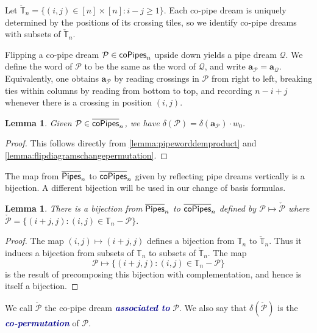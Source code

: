 \documentclass[12 pt]{amsart}
\newcommand{\newword}[1]{\textcolor{darkblue}{\textbf{\emph{#1}}}}
\newtheorem{lemma}[Theorem]{Lemma}
\numberwithin{equation}{section}
\theoremstyle{remark}
\newcommand{\kpipes}{\overline{\sf Pipes}}
\newcommand{\copipes}{{\sf coPipes}}
\newcommand{\kcopipes}{\overline{\sf coPipes}}
\newcommand{\demprod}{\delta}
\begin{document}
	
	Let $\check{\mathbb{T}}_n = \{(i, j) \in [n] \times [n] : i - j \geq 1\}$. 
	Each co-pipe dream is uniquely determined by the positions of its crossing tiles, so we identify co-pipe dreams with subsets of $\check{\mathbb{T}}_n$.
	
	
	
	Flipping a co-pipe dream $\mathcal{P} \in \copipes_n$ upside down yields a pipe dream $\mathcal{Q}$. 
	We define the word of $\mathcal{P}$ to be the same as the word of $\mathcal{Q}$, and write $\mathbf{a}_{\mathcal{P}} = \mathbf{a}_{\mathcal{Q}}$. 
	Equivalently, one obtains $\mathbf{a}_{\mathcal{P}}$ by reading crossings in $\mathcal{P}$ from right to left, breaking ties within columns by reading from bottom to top, and recording $n-i+j$ whenever there is a crossing in position $(i,j)$.

	
	
	
	\begin{lemma}
		\label{lemma:copipewordandpermutation}
		Given $\mathcal{P} \in \kcopipes_n$, we have $\demprod(\mathcal{P}) = \demprod(\mathbf{a}_{\mathcal{P}}) \cdot w_0$.
	\end{lemma}
	\begin{proof}
		This follows directly from \cref{lemma:pipeworddemproduct} and \cref{lemma:flipdiagramschangepermutation}.
	\end{proof}
	
	The map from $\kpipes_n$ to $\kcopipes_n$ given by reflecting pipe dreams vertically is a bijection. 
	A different bijection will be used in our change of basis formulas. 
	
	\begin{lemma}
		There is a bijection from $\kpipes_n$ to $\kcopipes_n$ defined by $\mathcal{P} \mapsto \check{\mathcal{P}}$ where $\check{\mathcal{P}} = \{(i + j,j) : (i,j) \in \mathbb{T}_n-\mathcal{P}\}.$
	\end{lemma}
	\begin{proof}
		The map $(i,j) \mapsto (i + j,j)$ defines a bijection from $\mathbb{T}_n$ to $\check{\mathbb T}_n$. 
		Thus it induces a bijection from subsets of $\mathbb{T}_n$ to subsets of $\check{\mathbb T}_n$. 
		The map 
		\[\mathcal{P} \mapsto \{(i + j,j):(i,j) \in \mathbb{T}_n-\mathcal{P}\}\]
		is the result of precomposing this bijection with complementation, and hence is itself a bijection. 
	\end{proof}
	
	We call $\check{\mathcal{P}}$ the co-pipe dream \newword{associated to} $\mathcal{P}$. 
	We also say that $\demprod(\check{\mathcal{P}})$ is the \newword{co-permutation} of $\mathcal{P}$.
	
\end{document}
